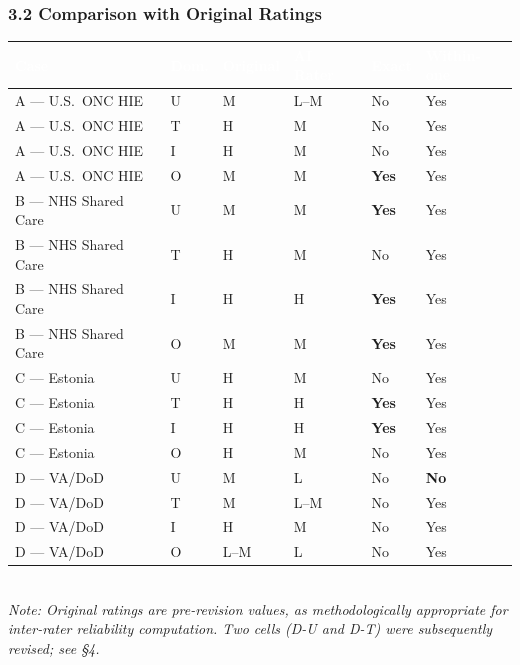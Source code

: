\subsubsection*{3.2 Comparison with Original Ratings}

\begin{table}[H]
\footnotesize
\centering
\setlength{\tabcolsep}{5pt}
\renewcommand{\arraystretch}{1.2}
\begin{tabular}{p{2.8cm} >{\centering\arraybackslash}p{0.8cm} >{\centering\arraybackslash}p{1.3cm} >{\centering\arraybackslash}p{1.8cm} >{\centering\arraybackslash}p{1.5cm} >{\centering\arraybackslash}p{2.0cm}}
\toprule
\rowcolor{headerblue}
\textcolor{white}{\textbf{Case}} &
\textcolor{white}{\textbf{Dom.}} &
\textcolor{white}{\textbf{Original}} &
\textcolor{white}{\textbf{AI Rater}} &
\textcolor{white}{\textbf{Exact}} &
\textcolor{white}{\textbf{Within-one}} \\
\midrule

\rowcolor{rowgray}
A --- U.S.\ ONC HIE & U & M & L--M & No & Yes \\
A --- U.S.\ ONC HIE & T & H & M & No & Yes \\
\rowcolor{rowgray}
A --- U.S.\ ONC HIE & I & H & M & No & Yes \\
A --- U.S.\ ONC HIE & O & M & M & \textbf{Yes} & Yes \\
\rowcolor{rowgray}
B --- NHS Shared Care & U & M & M & \textbf{Yes} & Yes \\
B --- NHS Shared Care & T & H & M & No & Yes \\
\rowcolor{rowgray}
B --- NHS Shared Care & I & H & H & \textbf{Yes} & Yes \\
B --- NHS Shared Care & O & M & M & \textbf{Yes} & Yes \\
\rowcolor{rowgray}
C --- Estonia & U & H & M & No & Yes \\
C --- Estonia & T & H & H & \textbf{Yes} & Yes \\
\rowcolor{rowgray}
C --- Estonia & I & H & H & \textbf{Yes} & Yes \\
C --- Estonia & O & H & M & No & Yes \\
\rowcolor{rowgray}
D --- VA/DoD & U & M & L & No & \textbf{No} \\
D --- VA/DoD & T & M & L--M & No & Yes \\
\rowcolor{rowgray}
D --- VA/DoD & I & H & M & No & Yes \\
D --- VA/DoD & O & L--M & L & No & Yes \\

\bottomrule
\end{tabular}
\vspace{4pt}\\
{\footnotesize\textit{Note: Original ratings are pre-revision values, as methodologically appropriate for inter-rater reliability computation. Two cells (D-U and D-T) were subsequently revised; see §4.}}
\end{table}

